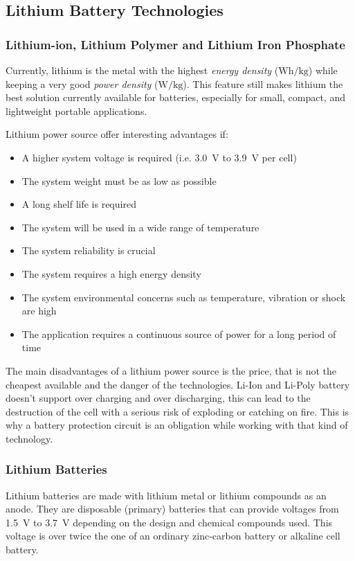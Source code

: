 \documentclass[report.tex]{subfiles}
\begin{document}
\subsection{Lithium Battery Technologies\cite{litBatTech}}

\subsubsection{Lithium-ion, Lithium Polymer and Lithium Iron Phosphate\cite{litBatTech}}
Currently, lithium is the metal with the highest \textit{energy density} ($\si{\watt\hour\per\kilogram}$) while keeping a very good \textit{power density} ($\si{\watt\per\kilogram}$). This feature still makes lithium the best solution currently available for batteries, especially for small, compact, and lightweight portable applications.

Lithium power source offer interesting advantages if:
\begin{itemize}
\item A higher system voltage is required (i.e. \SI{3.0}{\volt} to \SI{3.9}{\volt} per cell)
\item The system weight must be as low as possible
\item A long shelf life is required
\item The system will be used in a wide range of temperature
\item The system reliability is crucial 
\item The system requires a high energy density
\item The system environmental concerns such as temperature, vibration or shock are high
\item The application requires a continuous source of power for a long period of time\\
\end{itemize}

The main disadvantages of a lithium power source is the price, that is not the cheapest available and the danger of the technologies. Li-Ion and Li-Poly battery doesn't support over charging and over discharging, this can lead to the destruction of the cell with a serious risk of exploding or catching on fire. This is why a battery protection circuit is an obligation while working with that kind of technology. 

\subsubsection{Lithium Batteries\cite{litBatTech}}
Lithium batteries are made with lithium metal or lithium compounds as an anode. They are disposable (primary) batteries that can provide voltages from \SI{1.5}{\volt} to \SI{3.7}{\volt} depending on the design and chemical compounds used. This voltage is over twice the one of an ordinary zinc-carbon battery or alkaline cell battery.
\end{document}
